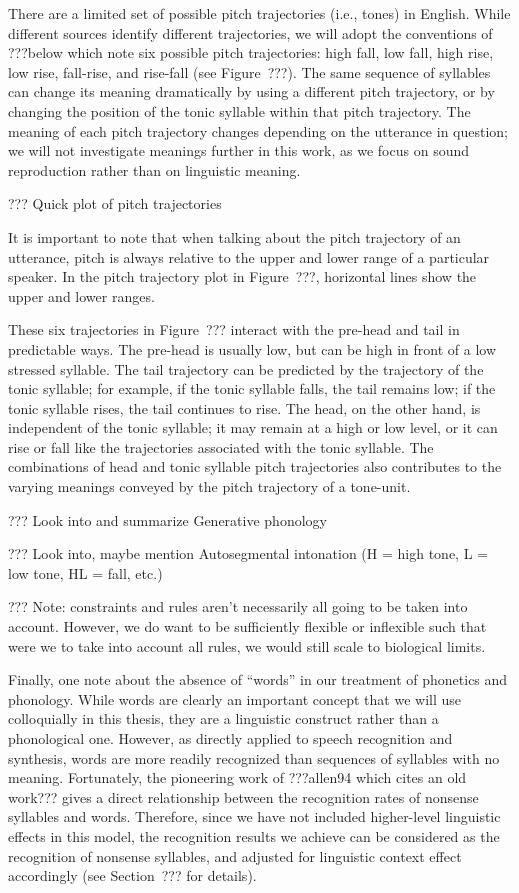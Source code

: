 There are a limited set of possible pitch trajectories
(i.e., tones) in English.
While different sources identify different trajectories,
we will adopt the conventions of ???below
which note six possible pitch trajectories:
high fall, low fall, high rise,
low rise, fall-rise, and rise-fall
(see Figure~???).
The same sequence of syllables
can change its meaning dramatically
by using a different pitch trajectory,
or by changing the position of the
tonic syllable within that pitch trajectory.
The meaning of each pitch trajectory
changes depending on the utterance in question;
we will not investigate meanings further
in this work, as we focus on
sound reproduction rather than on
linguistic meaning.

??? Quick plot of pitch trajectories


It is important to note that when talking about
the pitch trajectory of an utterance,
pitch is always relative to the
upper and lower range of a particular speaker.
In the pitch trajectory plot in Figure~???,
horizontal lines show the upper and lower ranges.

These six trajectories in Figure~???
interact with the pre-head and tail
in predictable ways.
The pre-head is usually low,
but can be high in front of a low stressed syllable.
The tail trajectory can be predicted
by the trajectory of the tonic syllable;
for example, if the tonic syllable falls,
the tail remains low;
if the tonic syllable rises,
the tail continues to rise.
The head, on the other hand,
is independent of the tonic syllable;
it may remain at a high or low level,
or it can rise or fall like
the trajectories associated with the tonic syllable.
The combinations of head and tonic syllable
pitch trajectories also contributes
to the varying meanings conveyed
by the pitch trajectory of a tone-unit.

??? Look into and summarize Generative phonology

??? Look into, maybe mention Autosegmental intonation
(H = high tone, L = low tone, HL = fall, etc.)

??? Note: constraints and rules aren't necessarily all going to
be taken into account. However, we do want to be sufficiently
flexible or inflexible such that were we to take into account
all rules, we would still scale to biological limits.

Finally, one note about
the absence of ``words'' in our treatment
of phonetics and phonology.
While words are clearly an important concept
that we will use colloquially in this thesis,
they are a linguistic construct
rather than a phonological one.
However, as directly applied
to speech recognition and synthesis,
words are more readily recognized
than sequences of syllables with no meaning.
Fortunately, the pioneering work
of ???allen94 which cites an old work???
gives a direct relationship between
the recognition rates of nonsense syllables and words.
Therefore, since we have not included
higher-level linguistic effects in this model,
the recognition results we achieve
can be considered as the recognition
of nonsense syllables,
and adjusted for linguistic context effect
accordingly (see Section~??? for details).

